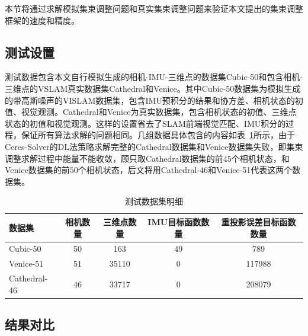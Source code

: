 本节将通过求解模拟集束调整问题和真实集束调整问题来验证本文提出的集束调整框架的速度和精度。

\subsection{测试设置}

测试数据包含本文自行模拟生成的相机-IMU-三维点的数据集Cubic-50和包含相机-三维点的VSLAM真实数据集Cathedral\citep{kim2014influence}和Venice\citep{kummerle2011g}。其中Cubic-50数据集为模拟生成的带高斯噪声的VISLAM数据集，包含IMU预积分的结果和协方差、相机状态的初值、视觉观测。Cathedral和Venice为真实数据集，包含相机状态的初值、三维点状态的初值和视觉观测。这样的设置省去了SLAM前端视觉匹配、IMU积分的过程，保证所有算法求解的问题相同。几组数据具体包含的内容如表~\ref{tab:dataset}所示，由于Ceres-Solver的DL法策略求解完整的Cathedral数据集和Venice数据集失败，即集束调整求解过程中能量不能收敛，顾只取Cathedral数据集的前$45$个相机状态，和Venice数据集的前$50$个相机状态，后文将用Cathedral-46和Venice-51代表这两个数据集。

{
\linespread{1}
\begin{table}[htb!]
\caption{测试数据集明细}
\label{tab:dataset}
\centering
\begin{tabular}{l|cccc}
    \toprule
    数据集       & 相机数量 & 三维点数量 & IMU目标函数数量 & 重投影误差目标函数数量 \\ \midrule
    Cubic-50     &       50 &        163 &              49 &                    789 \\
    Venice-51    &       51 &      35110 &               0 &                 117988 \\
    Cathedral-46 &       46 &      33717 &               0 &                 208079 \\
    \bottomrule
\end{tabular}
\end{table}
}

\subsection{结果对比}

